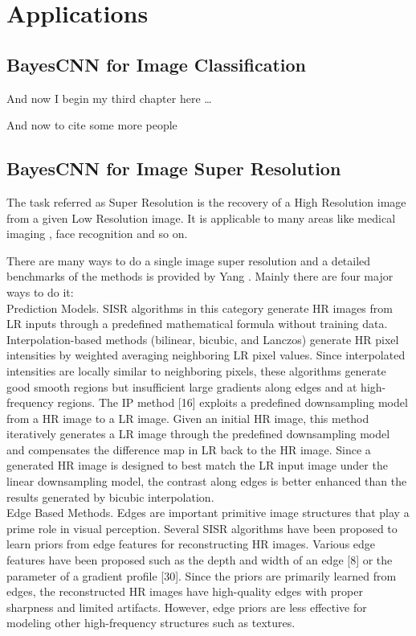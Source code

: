 \chapter{Applications}


\section{BayesCNN for Image Classification}
And now I begin my third chapter here \dots

And now to cite some more people~\citet{Rea85,Ancey1996}

\section{BayesCNN for Image Super Resolution}

The task referred as Super Resolution is the recovery of a High Resolution image from a given Low Resolution image. It is applicable to many areas like medical imaging \citet{10.1007/978-3-642-40760-4_2}, face recognition \citet{1203152} and so on.

There are many ways to do a single image super resolution and a detailed benchmarks of the methods is provided by Yang \citet{Yang2014SingleImageSA}. Mainly there are four major ways to do it:\\
Prediction Models. SISR algorithms in this category generate HR images
from LR inputs through a predefined mathematical formula without training
data. Interpolation-based methods (bilinear, bicubic, and Lanczos) generate HR
pixel intensities by weighted averaging neighboring LR pixel values. Since interpolated intensities are locally similar to neighboring pixels, these algorithms generate good smooth regions but insufficient large gradients along edges and at high-frequency regions. The IP method [16] exploits a predefined downsampling model from a HR image to a LR image. Given an initial HR image, this method iteratively generates a LR image through the predefined downsampling
model and compensates the difference map in LR back to the HR image. Since
a generated HR image is designed to best match the LR input image under the
linear downsampling model, the contrast along edges is better enhanced than
the results generated by bicubic interpolation.\\

Edge Based Methods. Edges are important primitive image structures that
play a prime role in visual perception. Several SISR algorithms have been proposed to learn priors from edge features for reconstructing HR images. Various edge features have been proposed such as the depth and width of an edge [8] or the parameter of a gradient profile [30]. Since the priors are primarily learned from edges, the reconstructed HR images have high-quality edges with proper sharpness and limited artifacts. However, edge priors are less effective for modeling other high-frequency structures such as textures.\\

